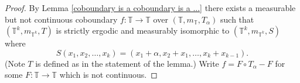 \documentclass[12pt]{amsart}
\theoremstyle{definition}
\theoremstyle{plain}
\theoremstyle{definition}
\numberwithin{equation}{section}
\begin{document}
\begin{proof}
     By Lemma \ref{coboundary is a coboundary is a ...} there exists a measurable but not continuous coboundary $f\colon \mathbb{T} \rightarrow \mathbb{T}$ over $(\mathbb{T},m_{\mathbb{T}},T_{\alpha})$ %
      such that $(\mathbb{T}^{k},m_{\mathbb{T}^{k}},T)$ is strictly ergodic and measurably isomorphic to $(\mathbb{T}^{k},m_{\mathbb{T}^{k}},S)$ where $$S(x_1,x_2,\dots,x_k)=(x_1+\alpha,x_2+x_1,\dots, x_k+x_{k-1}).$$ (Note $T$ is defined as in the statement of the lemma.) Write $f=F\circ T_{\alpha}-F$ for some $F\colon \mathbb{T} \rightarrow \mathbb{T}$ which is not continuous.




\end{proof}
\end{document}
